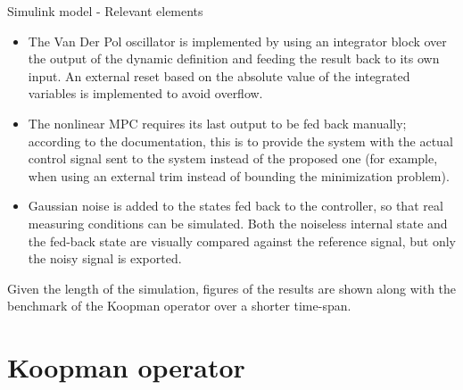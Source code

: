 \documentclass{beamer}
\begin{document}
\begin{frame}{Simulink model - Relevant elements}
    \small
    \begin{itemize}
        \item The Van Der Pol oscillator is implemented by using an integrator block over the output of the dynamic definition and feeding the result back to its own input. An external reset based on the absolute value of the integrated variables is implemented to avoid overflow.
        \item The nonlinear MPC requires its last output to be fed back manually; according to the documentation, this is to provide the system with the actual control signal sent to the system instead of the proposed one (for example, when using an external trim instead of bounding the minimization problem).
        \item Gaussian noise is added to the states fed back to the controller, so that real measuring conditions can be simulated. Both the noiseless internal state and the fed-back state are visually compared against the reference signal, but only the noisy signal is exported.
    \end{itemize}

    Given the length of the simulation, figures of the results are shown along with the benchmark of the Koopman operator over a shorter time-span.
\end{frame}


\section{Koopman operator}
\end{document}
